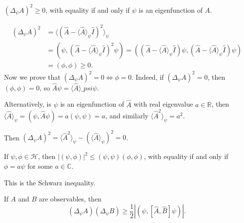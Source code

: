 \documentclass[12pt]{article}
\begin{document}
\begin{lemma}
	$(\Delta_{\psi} A)^2 \geq 0$, with equality if and only if $\psi$ is an eigenfunction of $A$.
\end{lemma}

\begin{proofbox}
	\begin{align*}
		(\Delta_{\psi}A)^2 &= \langle (\hat A - \langle \hat A \rangle_{\psi} \hat I)^2 \rangle_{\psi} \\
				   &= (\psi, (\hat A - \langle \hat A \rangle_{\psi} \hat I)^2 \psi) = ((\hat A - \langle \hat A \rangle_{\psi} \hat I)\psi, (\hat A - \langle \hat A \rangle_{\psi} \hat I)\psi) \\
				   &= (\phi, \phi) \geq 0.
	\end{align*}
	Now we prove that $(\Delta_{\psi}A)^2 = 0 \iff \phi = 0$. Indeed, if $(\Delta_{\psi}A)^2 = 0$, then $(\phi, \phi) = 0$, so $\hat A \psi = \langle \hat A \rangle\_{psi} \psi$.

		Alternatively, is $\psi$ is an eigenfunction of $\hat A$ with real eigenvalue $a \in \mathbb{R}$, then $\langle \hat A \rangle_{\psi} = (\psi, \hat A \psi) = a (\psi, \psi) = a$, and similarly $\langle \hat A^2 \rangle_{\psi} = a^2$.

		Then $(\Delta_{\psi}A)^2 = \langle \hat A^2 \rangle_{\psi} - (\langle \hat A \rangle_{\psi})^2 = 0$.
\end{proofbox}

\begin{lemma}
	If $\psi, \phi \in \mathcal{H}$, then $|(\psi, \phi)|^2 \leq (\psi, \psi)(\phi, \phi)$, with equality if and only if $\phi = a \psi$ for some $a \in \mathbb{C}$.
\end{lemma}

This is the Schwarz inequality.

\begin{theorem}
	If $A$ and $B$ are observables, then
	\[
		(\Delta_{\psi}A)(\Delta_{\psi}B) \geq \frac{1}{2} |(\psi, [\hat A, \hat B]\psi)|
	.\]
\end{theorem}
\end{document}

